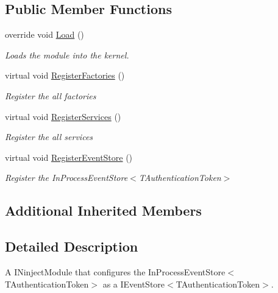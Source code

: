 \subsection*{Public Member Functions}
\begin{DoxyCompactItemize}
\item 
override void \hyperlink{classCqrs_1_1Ninject_1_1Configuration_1_1InProcessEventStoreModule_a6383665ddfef93febbccf74879f1c412_a6383665ddfef93febbccf74879f1c412}{Load} ()
\begin{DoxyCompactList}\small\item\em Loads the module into the kernel. \end{DoxyCompactList}\item 
virtual void \hyperlink{classCqrs_1_1Ninject_1_1Configuration_1_1InProcessEventStoreModule_ad7c8b29dc07669735b06a7602b1b2270_ad7c8b29dc07669735b06a7602b1b2270}{Register\+Factories} ()
\begin{DoxyCompactList}\small\item\em Register the all factories \end{DoxyCompactList}\item 
virtual void \hyperlink{classCqrs_1_1Ninject_1_1Configuration_1_1InProcessEventStoreModule_acd21e06bbdf91a25230d215958163456_acd21e06bbdf91a25230d215958163456}{Register\+Services} ()
\begin{DoxyCompactList}\small\item\em Register the all services \end{DoxyCompactList}\item 
virtual void \hyperlink{classCqrs_1_1Ninject_1_1Configuration_1_1InProcessEventStoreModule_a6df39e45769455f0ede4f883dc511d61_a6df39e45769455f0ede4f883dc511d61}{Register\+Event\+Store} ()
\begin{DoxyCompactList}\small\item\em Register the In\+Process\+Event\+Store$<$\+T\+Authentication\+Token$>$ \end{DoxyCompactList}\end{DoxyCompactItemize}
\subsection*{Additional Inherited Members}


\subsection{Detailed Description}
A I\+Ninject\+Module that configures the In\+Process\+Event\+Store$<$\+T\+Authentication\+Token$>$ as a I\+Event\+Store$<$\+T\+Authentication\+Token$>$. 


